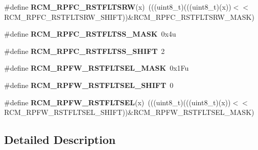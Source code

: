 \begin{DoxyCompactItemize}
\#define {\bfseries R\+C\+M\+\_\+\+R\+P\+F\+C\+\_\+\+R\+S\+T\+F\+L\+T\+S\+RW}(x)~(((uint8\+\_\+t)(((uint8\+\_\+t)(x))$<$$<$R\+C\+M\+\_\+\+R\+P\+F\+C\+\_\+\+R\+S\+T\+F\+L\+T\+S\+R\+W\+\_\+\+S\+H\+I\+FT))\&R\+C\+M\+\_\+\+R\+P\+F\+C\+\_\+\+R\+S\+T\+F\+L\+T\+S\+R\+W\+\_\+\+M\+A\+SK)
\item 
\mbox{\label{group___r_c_m___register___masks_gadfb0f8132fbbc978c9756a2adfbf2ed0}} 
\#define {\bfseries R\+C\+M\+\_\+\+R\+P\+F\+C\+\_\+\+R\+S\+T\+F\+L\+T\+S\+S\+\_\+\+M\+A\+SK}~0x4u
\item 
\mbox{\label{group___r_c_m___register___masks_ga4c39eb26fa537bf5e4e6b0ea82ffaeb2}} 
\#define {\bfseries R\+C\+M\+\_\+\+R\+P\+F\+C\+\_\+\+R\+S\+T\+F\+L\+T\+S\+S\+\_\+\+S\+H\+I\+FT}~2
\item 
\mbox{\label{group___r_c_m___register___masks_ga60f29f78d245476ae9716d81b5728739}} 
\#define {\bfseries R\+C\+M\+\_\+\+R\+P\+F\+W\+\_\+\+R\+S\+T\+F\+L\+T\+S\+E\+L\+\_\+\+M\+A\+SK}~0x1\+Fu
\item 
\mbox{\label{group___r_c_m___register___masks_ga489d9757284af48af000b769d36bf21a}} 
\#define {\bfseries R\+C\+M\+\_\+\+R\+P\+F\+W\+\_\+\+R\+S\+T\+F\+L\+T\+S\+E\+L\+\_\+\+S\+H\+I\+FT}~0
\item 
\mbox{\label{group___r_c_m___register___masks_ga2b2127fc8187199672452ef9f62f6a89}} 
\#define {\bfseries R\+C\+M\+\_\+\+R\+P\+F\+W\+\_\+\+R\+S\+T\+F\+L\+T\+S\+EL}(x)~(((uint8\+\_\+t)(((uint8\+\_\+t)(x))$<$$<$R\+C\+M\+\_\+\+R\+P\+F\+W\+\_\+\+R\+S\+T\+F\+L\+T\+S\+E\+L\+\_\+\+S\+H\+I\+FT))\&R\+C\+M\+\_\+\+R\+P\+F\+W\+\_\+\+R\+S\+T\+F\+L\+T\+S\+E\+L\+\_\+\+M\+A\+SK)
\end{DoxyCompactItemize}


\subsection{Detailed Description}
